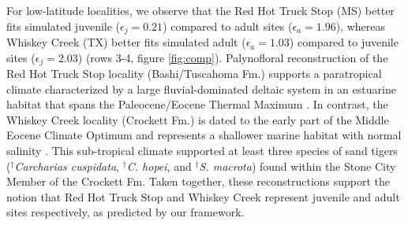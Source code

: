\documentclass[]{rsos}%
\begin{document}




For low-latitude localities, we observe that the Red Hot Truck Stop (MS) better fits simulated juvenile ($\epsilon_j = 0.21$) compared to adult sites ($\epsilon_a = 1.96$), whereas Whiskey Creek (TX) better fits simulated adult ($\epsilon_a = 1.03$) compared to juvenile sites ($\epsilon_j = 2.03$) (rows 3-4, figure \ref{fig:comp}).
Palynofloral reconstruction of the Red Hot Truck Stop locality (Bashi/Tuscahoma Fm.) supports a paratropical climate \cite{Harrington2003} characterized by a large fluvial-dominated deltaic system in an estuarine habitat that spans the Paleocene/Eocene Thermal Maximum \cite{Beard2009}. 
In contrast, the Whiskey Creek locality (Crockett Fm.) is dated to the early part of the Middle Eocene Climate Optimum \cite{Flis2017} and represents a shallower marine habitat with normal salinity \cite{Breard1999}. 
This sub-tropical climate supported at least three species of sand tigers (${}^\dag$\emph{Carcharias cuspidata}, ${}^\dag$\emph{C. hopei}, and ${}^\dag$\emph{S. macrota}) \cite{Breard1999, Westgate} found within the Stone City Member of the Crockett Fm.
Taken together, these reconstructions support the notion that Red Hot Truck Stop and Whiskey Creek represent juvenile and adult sites respectively, as predicted by our framework. 

\end{document}
